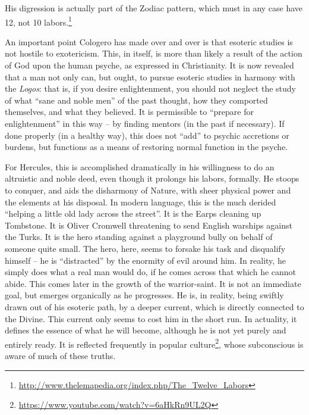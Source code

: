 His digression is actually part of the Zodiac pattern, which must in any case have 12, not 10 labors.\footnote{\url{http://www.thelemapedia.org/index.php/The\_Twelve\_Labors}}

An important point Cologero has made over and over is that esoteric studies is not hostile to exotericism. This, in itself, is more than likely a result of the action of God upon the human psyche, as expressed in Christianity. It is now revealed that a man not only can, but ought, to pursue esoteric studies in harmony with the \emph{Logos}: that is, if you desire enlightenment, you should not neglect the study of what ``sane and noble men'' of the past thought, how they comported themselves, and what they believed. It is permissible to ``prepare for enlightenment'' in this way -- by finding mentors (in the past if necessary). If done properly (in a healthy way), this does not ``add'' to psychic accretions or burdens, but functions as a means of restoring normal function in the psyche.

For Hercules, this is accomplished dramatically in his willingness to do an altruistic and noble deed, even though it prolongs his labors, formally. He stoops to conquer, and aids the disharmony of Nature, with sheer physical power and the elements at his disposal. In modern language, this is the much derided ``helping a little old lady across the street''. It is the Earps cleaning up Tombstone. It is Oliver Cromwell threatening to send English warships against the Turks. It is the hero standing against a playground bully on behalf of someone quite small. The hero, here, seems to forsake his task and disqualify himself -- he is ``distracted'' by the enormity of evil around him. In reality, he simply does what a real man would do, if he comes across that which he cannot abide. This comes later in the growth of the warrior-saint. It is not an immediate goal, but emerges organically as he progresses. He is, in reality, being swiftly drawn out of his esoteric path, by a deeper current, which is directly connected to the Divine. This current only seems to cost him in the short run. In actuality, it defines the essence of what he will become, although he is not yet purely and entirely ready. It is reflected frequently in popular culture\footnote{\url{https://www.youtube.com/watch?v=6aHkRn9UL2Q}}, whose subconscious is aware of much of these truths.

